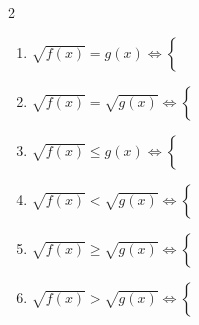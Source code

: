 \documentclass[12pt,a4paper]{article}
\begin{document}
\begin{multicols}{2}
\setlength{\columnseprule}{0.1mm} %
\begin{enumerate}
\item $
\sqrt{ f(x)} = g(x) \Leftrightarrow \begin{cases}
\\
 \\
\\
\\
\end{cases}
$

\item $
\sqrt{ f(x)} = \sqrt{ g(x)} \Leftrightarrow \begin{cases}
\\
 \\
\\
\\
\end{cases}
$

\item $
\sqrt{ f(x)} \leq g(x) \Leftrightarrow \begin{cases}
\\
 \\
\\
\\
\end{cases}
$

\item $
\sqrt{ f(x)} < \sqrt{ g(x)} \Leftrightarrow \begin{cases}
\\
 \\
\\
\\
\end{cases}
$

\item $
\sqrt{ f(x)} \geq \sqrt{ g(x)} \Leftrightarrow \begin{cases}
\\
 \\
\\
\\
\end{cases}
$

\item $
\sqrt{ f(x)} > \sqrt{ g(x)} \Leftrightarrow \begin{cases}
\\
 \\
\\
\\
\end{cases}
$


\end{enumerate}
\end{multicols}
\end{document}
